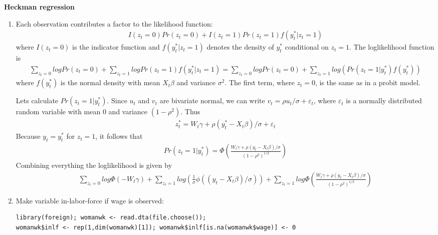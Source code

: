 \begin{Solution}{12.8}
\textbf{Heckman regression}

\begin{enumerate}
\item Each observation contributes a factor to the likelihood function:
\begin{align*}
I(z_t=0)Pr(z_t=0) + I(z_t=1)Pr(z_t=1)f(y_t^*|z_t=1)
\end{align*}
where $I(z_t=0)$ is the indicator function and $f(y_t^*|z_t=1)$ denotes the density of $y_t^*$ conditional on $z_t=1$. The loglikelihood function is
\begin{align*}
\sum_{z_t=0}log Pr(z_t=0) + \sum_{z_t=1}log Pr(z_t=1)f(y_t^*|z_t=1) = \sum_{z_t=0}log Pr(z_t=0) + \sum_{z_t=1}log\left(Pr(z_t=1|y_t^*)f(y_t^*)\right)
\end{align*}
where $f(y_t^*)$ is the normal density with mean $X_t\beta$ and variance $\sigma^2$. The first term, where $z_t=0$, is the same as in a probit model.

Lets calculate $Pr(z_t=1|y_t^*)$. Since $u_t$ and $v_t$ are bivariate normal, we can write $v_t=\rho u_t/\sigma + \varepsilon_t$, where $\varepsilon_t$ is a normally distributed random variable with mean 0 and variance $(1-\rho^2)$. Thus
\begin{align*}
z_t^* = W_t\gamma+\rho(y_t^*-X_t\beta)/\sigma + \varepsilon_t
\end{align*}
Because $y_t=y_t^*$ for $z_t=1$, it follows that
\begin{align*}
Pr(z_t=1|y_t^*) = \Phi\left(\frac{W_t\gamma + \rho(y_t-X_t\beta)/\sigma}{(1-\rho^2)^{1/2}}\right)
\end{align*}
Combining everything the loglikelihood is given by
\begin{align*}
\sum_{z_t=0}log\Phi(-W_t\gamma) + \sum_{z_t=1}log\left(\frac{1}{\sigma}\phi\left((y_t-X_t\beta)/\sigma\right)\right) + \sum_{z_t=1} log \Phi\left(\frac{W_t\gamma + \rho(y_t-X_t\beta)/\sigma}{(1-\rho^2)^{1/2}}\right)
\end{align*}

\item Make variable in-labor-force if wage is observed:
\begin{verbatim}
library(foreign); womanwk <- read.dta(file.choose());
womanwk$inlf <- rep(1,dim(womanwk)[1]); womanwk$inlf[is.na(womanwk$wage)] <- 0
\end{verbatim}


\end{enumerate}
\end{Solution}
